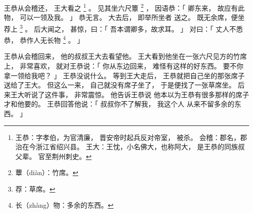 
\switchcolumn*[\section{}]

王恭从会稽还，
王大看之%
\footnote{%
    王恭：字孝伯，为官清廉，
          晋安帝时起兵反对帝室，
          被杀。
    会稽：郡名，郡治在今浙江省绍兴县。
    王大：王忱，小名佛大，也称阿大，
          是王恭的同族叔父辈。
          官至荆州刺史。
}%
。
见其坐六尺簟%
\footnote{%
    蕈（diàn）：竹席。
}%
，
因语恭：「
    卿东来，
    故应有此物，
    可以一领及我。
」
恭无言。
大去后，
即举所坐者
送之。
既无余席，便坐荐上%
\footnote{%
    荐：草席。
}%
。
后大闻之，
甚惊，曰：「
    吾本谓卿多，故求耳。
」
对曰：「
    丈人不悉恭，
    恭作人无长物%
    \footnote{%
        长（zhàng）物：多余的东西。
    }%
    。
」

\switchcolumn

王恭从会稽回来，
他的叔叔王大去看望他。
王大看到他坐在一张六尺见方的竹席上，
非常喜欢，
就对王恭说：「
    你从东边回来，
    难怪有这样的好东西。
    要不你拿一领给我吧？
」
王恭没说什么。
等到王大走后，
王恭就把自己坐的那张席子
送给了王大。
但这么一来，
自己就没有席子坐了，
于是便找了一张草席坐。
后来王大听说了这件事，
非常震惊。
他告诉王恭说
他本以为王恭有很多那样的席子
才和他要的。
王恭回答他说：「
    叔叔你不了解我，
    我这个人
    从来不留多余的东西。
」

